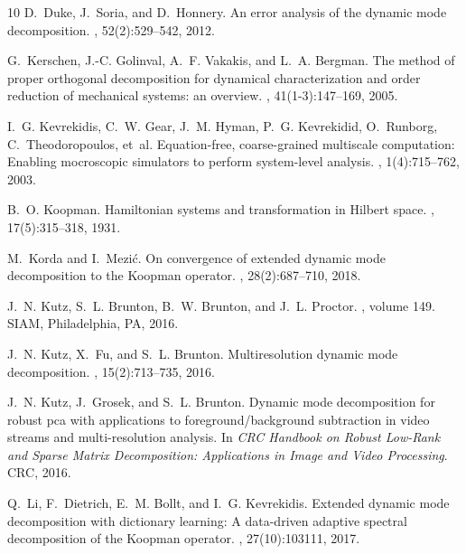 \documentclass[10pt]{article}
\numberwithin{equation}{section}
\theoremstyle{plain}
\theoremstyle{remark}
\theoremstyle{remark}
\begin{document}
\begin{thebibliography}{10}
D.~Duke, J.~Soria, and D.~Honnery.
\newblock An error analysis of the dynamic mode decomposition.
, 52(2):529--542, 2012.

G.~Kerschen, J.-C. Golinval, A.~F. Vakakis, and L.~A. Bergman.
\newblock The method of proper orthogonal decomposition for dynamical
  characterization and order reduction of mechanical systems: an overview.
, 41(1-3):147--169, 2005.

I.~G. Kevrekidis, C.~W. Gear, J.~M. Hyman, P.~G. Kevrekidid, O.~Runborg,
  C.~Theodoropoulos, et~al.
\newblock Equation-free, coarse-grained multiscale computation: {E}nabling
  mocroscopic simulators to perform system-level analysis.
, 1(4):715--762, 2003.

B.~O. Koopman.
\newblock Hamiltonian systems and transformation in {H}ilbert space.
, 17(5):315--318, 1931.

M.~Korda and I.~Mezi{\'c}.
\newblock On convergence of extended dynamic mode decomposition to the
  {K}oopman operator.
, 28(2):687--710, 2018.

J.~N. Kutz, S.~L. Brunton, B.~W. Brunton, and J.~L. Proctor.
, volume 149.
\newblock SIAM, Philadelphia, PA, 2016.

J.~N. Kutz, X.~Fu, and S.~L. Brunton.
\newblock Multiresolution dynamic mode decomposition.
, 15(2):713--735, 2016.

J.~N. Kutz, J.~Grosek, and S.~L. Brunton.
\newblock Dynamic mode decomposition for robust pca with applications to
  foreground/background subtraction in video streams and multi-resolution
  analysis.
\newblock In {\em CRC Handbook on Robust Low-Rank and Sparse Matrix
  Decomposition: Applications in Image and Video Processing}. CRC, 2016.

Q.~Li, F.~Dietrich, E.~M. Bollt, and I.~G. Kevrekidis.
\newblock Extended dynamic mode decomposition with dictionary learning: {A}
  data-driven adaptive spectral decomposition of the {K}oopman operator.
, 27(10):103111, 2017.


\end{thebibliography}
\end{document}
